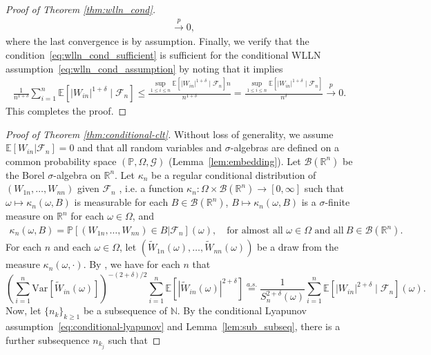 \documentclass[aos]{imsart}
\theoremstyle{definition}
\theoremstyle{remark}
\newcommand{\E}{\mathbb E}								%
\newcommand{\V}{\mathrm{Var}}							%
\renewcommand{\P}{\mathbb{P}}							%
\newcommand{\R}{\mathbb{R}}								%
\newcommand{\convp}{\overset p \rightarrow}             %
\begin{document}
\begin{proof}[Proof of Theorem \ref{thm:wlln_cond}]
\begin{align*}
			&
			\convp0,
		\end{align*}
		where the last convergence is by assumption. Finally, we verify that the condition~\eqref{eq:wlln_cond_sufficient} is sufficient for the conditional WLLN assumption~\eqref{eq:wlln_cond_assumption} by noting that it implies
		\begin{align*}
			\frac{1}{n^{1+\delta}} \sum_{i = 1}^n \E[|W_{in}|^{1+\delta} \mid \mathcal{F}_n]\leq \frac{\sup_{1\leq i\leq n}\E[|W_{in}|^{1+\delta} \mid \mathcal{F}_n]n}{n^{1+\delta}}=\frac{\sup_{1\leq i\leq n}\E[|W_{in}|^{1+\delta} \mid \mathcal{F}_n]}{n^{\delta}} \convp 0.
		\end{align*}
		This completes the proof.
	\end{proof}
	
	\begin{proof}[Proof of Theorem \ref{thm:conditional-clt}] 
		Without loss of generality, we assume $\E[W_{in}|\mathcal{F}_n]=0$ and that all random variables and $\sigma$-algebras are defined on a common probability space $(\P, \Omega, \mathcal G)$ (Lemma~\ref{lem:embedding}). Let $\mathcal B(\R^n)$ be the Borel $\sigma$-algebra on $\R^n$. Let $\kappa_{n}$ be a regular conditional distribution of $(W_{1n}, \dots, W_{nn})$ given $\mathcal{F}_{n}$ \citep[Theorem 8.37]{Lista2017}, i.e. a function $\kappa_{n}: \Omega \times \mathcal B(\R^n) \rightarrow [0,\infty]$ such that $\omega \mapsto \kappa_{n}(\omega, B)$ is measurable for each $B \in \mathcal B(\R^n)$, $B \mapsto \kappa_{n}(\omega, B)$ is a $\sigma$-finite measure on $\R^n$ for each $\omega \in \Omega$, and 
		\begin{align*}
			\kappa_{n}(\omega, B) = \P[(W_{1n}, \dots, W_{nn})\in B|\mathcal{F}_{n}](\omega), \quad \text{for almost all } \omega \in \Omega \text{ and all} \ B \in \mathcal B(\R^n).
		\end{align*}
		For each $n$ and each $\omega \in \Omega$, let $(\widetilde W_{1n}(\omega), \dots, \widetilde W_{nn}(\omega))$ be a draw from the measure $\kappa_n(\omega,\cdot)$. By \citet[Theorem 8.38]{Lista2017}, we have for each $n$ that
		\begin{equation*}
			\left(\sum_{i = 1}^n \V[\widetilde W_{in}(\omega)]\right)^{-(2+\delta)/2}\sum_{i = 1}^n \E[|\widetilde W_{in}(\omega)|^{2+\delta}] \overset{a.s.}= \frac{1}{S_{n}^{2+\delta}(\omega)} \sum_{i = 1}^{n} \E[|W_{in}|^{2+\delta} \mid \mathcal{F}_{n}](\omega).
		\end{equation*}
		Now, let $\{n_k\}_{k \geq 1}$ be a subsequence of $\mathbb N$. By the conditional Lyapunov assumption~\eqref{eq:conditional-lyapunov} and Lemma~\ref{lem:sub_subseq}, there is a further subsequence $n_{k_j}$ such that

\end{proof}
\end{document}
